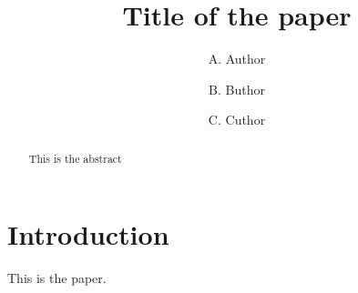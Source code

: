\documentclass{icsv}
\title{Title of the paper}
\author[1]{A. Author}
\author[1,2]{B. Buthor}
\author[2]{C. Cuthor}
\begin{document}
\maketitle

\begin{abstract}
This is the abstract
\end{abstract}

\section{Introduction} 
This is the paper.
\end{document}
